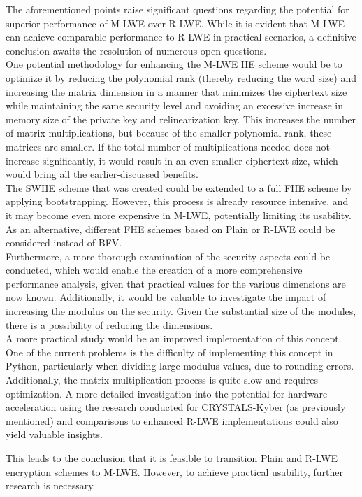 The aforementioned points raise significant questions regarding the potential for superior performance of M-LWE over R-LWE. While it is evident that M-LWE can achieve comparable performance to R-LWE in practical scenarios, a definitive conclusion awaits the resolution of numerous open questions.\\
One potential methodology for enhancing the M-LWE HE scheme would be to optimize it by reducing the polynomial rank (thereby reducing the word size) and increasing the matrix dimension in a manner that minimizes the ciphertext size while maintaining the same security level and avoiding an excessive increase in memory size of the private key and relinearization key. This increases the number of matrix multiplications, but because of the smaller polynomial rank, these matrices are smaller. If the total number of multiplications needed does not increase significantly, it would result in an even smaller ciphertext size, which would bring all the earlier-discussed benefits.\\
The SWHE scheme that was created could be extended to a full FHE scheme by applying bootstrapping. However, this process is already resource intensive, and it may become even more expensive in M-LWE, potentially limiting its usability. As an alternative, different FHE schemes based on Plain or R-LWE could be considered instead of BFV. \\
Furthermore, a more thorough examination of the security aspects could be conducted, which would enable the creation of a more comprehensive performance analysis, given that practical values for the various dimensions are now known. Additionally, it would be valuable to investigate the impact of increasing the modulus on the security. Given the substantial size of the modules, there is a possibility of reducing the dimensions.\\
A more practical study would be an improved implementation of this concept. One of the current problems is the difficulty of implementing this concept in Python, particularly when dividing large modulus values, due to rounding errors. Additionally, the matrix multiplication process is quite slow and requires optimization. A more detailed investigation into the potential for hardware acceleration using the research conducted for CRYSTALS-Kyber (as previously mentioned) and comparisons to enhanced R-LWE implementations could also yield valuable insights.

This leads to the conclusion that it is feasible to transition Plain and R-LWE encryption schemes to M-LWE. However, to achieve practical usability, further research is necessary.